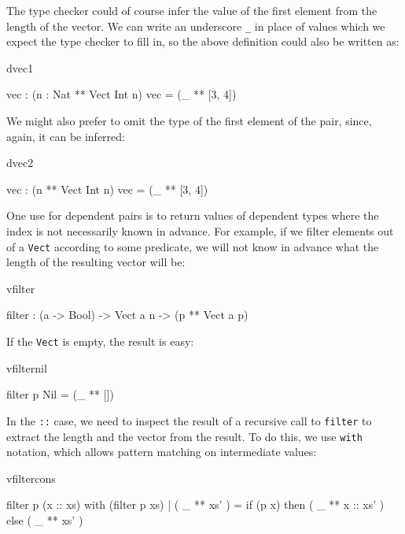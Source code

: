 \noindent
The type checker could of course infer the value of the first element from the
length of the vector. We can write an underscore \texttt{\_} in place of values which we
expect the type checker to fill in, so the above definition could also be
written as:

\begin{SaveVerbatim}{dvec1}

vec : (n : Nat ** Vect Int n)
vec = (_ ** [3, 4])

\end{SaveVerbatim}

\noindent
We might also prefer to omit the type of the first element of the pair, since,
again, it can be inferred:

\begin{SaveVerbatim}{dvec2}

vec : (n ** Vect Int n)
vec = (_ ** [3, 4])

\end{SaveVerbatim}

\noindent
One use for dependent pairs is to return values of dependent types where the
index is not necessarily known in advance. For example, if we filter elements
out of a \texttt{Vect} according to some predicate, we will not know in advance what the
length of the resulting vector will be:

\begin{SaveVerbatim}{vfilter}

filter : (a -> Bool) -> Vect a n -> (p ** Vect a p)

\end{SaveVerbatim}

\noindent
If the \texttt{Vect} is empty, the result is easy:

\begin{SaveVerbatim}{vfilternil}

filter p Nil = (_ ** [])

\end{SaveVerbatim}

\noindent
In the \texttt{::} case, we need to inspect the result of a recursive call to 
\texttt{filter} to
extract the length and the vector from the result. To do this, we use \texttt{with}
notation, which allows pattern matching on intermediate values:

\begin{SaveVerbatim}{vfiltercons}

filter p (x :: xs) with (filter p xs)
  | ( _ ** xs' ) = if (p x) then ( _ ** x :: xs' ) else ( _ ** xs' )

\end{SaveVerbatim}

